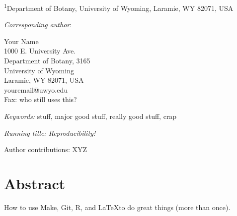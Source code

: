 \documentclass[letterpaper, 12pt]{article}
\begin{document}

\medskip


\bigskip   

\noindent \parbox[t]{6.5in}{\textsuperscript{1}Department of Botany, University of
  Wyoming, Laramie, WY 82071, USA}

\vspace{2in}

\noindent \emph{Corresponding author}: \parbox[t]{4in}{Your Name\\
  1000 E. University Ave.\\
  Department of Botany, 3165\\
  University of Wyoming\\
  Laramie, WY 82071, USA\\
  youremail@uwyo.edu\\
  Fax: who still uses this?
}

\bigskip

\noindent 
\emph{Keywords:} stuff, major good stuff, really good stuff, crap

\bigskip
\noindent \emph{Running title: Reproducibility!}

\bigskip

\noindent Author contributions: XYZ
\newpage


\section*{Abstract}
How to use Make, Git, R, and \LaTeX to do great things (more than once).
\end{document}
